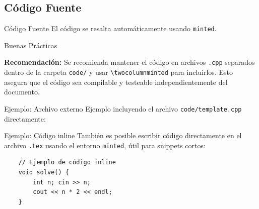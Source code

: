 \subsection{Código Fuente}

\begin{frame}{Código Fuente}
    El código se resalta automáticamente usando \texttt{minted}.
\end{frame}

\begin{frame}{Buenas Prácticas}
    \begin{TipP}
        \textbf{Recomendación:} Se recomienda mantener el código en archivos
        \texttt{.cpp} separados dentro de la carpeta \texttt{code/} y usar
        \texttt{\textbackslash twocolumnminted} para incluirlos. Esto asegura que
        el código sea compilable y testeable independientemente del documento.
    \end{TipP}
\end{frame}



\begin{frame}[fragile]{Ejemplo: Archivo externo}
    Ejemplo incluyendo el archivo \texttt{code/template.cpp} directamente:

\end{frame}

\begin{frame}[fragile]{Ejemplo: Código inline}
    También es posible escribir código directamente en el archivo \texttt{.tex} usando el entorno \texttt{minted}, útil para snippets cortos:

    \begin{verbatim}
    // Ejemplo de código inline
    void solve() {
        int n; cin >> n;
        cout << n * 2 << endl;
    }
    \end{verbatim}
\end{frame}
